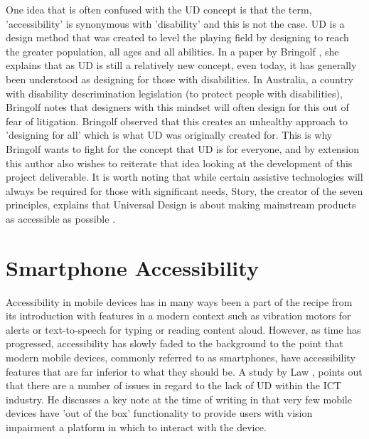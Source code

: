 One idea that is often confused with the UD concept is that the term, 'accessibility' is synonymous with 'disability' and this is not the case.
UD is a design method that was created to level the playing field by designing to reach the greater population, all ages and all abilities.
In a paper by Bringolf \cite{accessible}, she explains that as UD is still a relatively new concept, even today, it has generally been understood as designing for those with disabilities.
In Australia, a country with disability descrimination legislation (to protect people with disabilities), Bringolf notes that designers with this mindset will often design for this out of fear of litigation.
Bringolf observed that this creates an unhealthy approach to 'designing for all' which is what UD was originally created for. %
This is why Bringolf wants to fight for the concept that UD is for everyone, and by extension this author also wishes to reiterate that idea looking at the development of this project deliverable. %
It is worth noting that while certain assistive technologies will always be required for those with significant needs, Story, the creator of the seven principles, explains that Universal Design is about making mainstream products as accessible as possible \cite{sevenprinciples}.


\section{Smartphone Accessibility}
Accessibility in mobile devices has in many ways been a part of the recipe from its introduction with features in a modern context such as vibration motors for alerts or text-to-speech for typing or reading content aloud.
However, as time has progressed, accessibility has slowly faded to the background to the point that modern mobile devices, commonly referred to as smartphones, have accessibility features that are far inferior to what they should be. %
A study by Law \cite{cellphone}, points out that there are a number of issues in regard to the lack of UD within the ICT industry. %
He discusses a key note at the time of writing in that very few mobile devices have 'out of the box' functionality to provide users with vision impairment a platform in which to interact with the device. %

